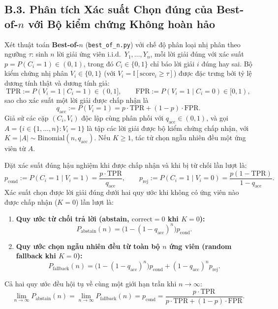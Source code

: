 \subsection{B.3. Phân tích Xác suất Chọn đúng của Best-of-$n$ với Bộ kiểm chứng Không hoàn hảo}
\label{subsec:b3-best-of-n}

Xét thuật toán \textbf{Best-of-$n$} (\texttt{best\_of\_n.py}) với chế độ phân loại nhị phân theo ngưỡng $\tau$: sinh $n$ lời giải ứng viên i.i.d.\ $Y_1, \dots, Y_n$, mỗi lời giải đúng với xác suất $p = P(C_i = 1) \in (0, 1)$, trong đó $C_i \in \{0, 1\}$ chỉ báo lời giải $i$ đúng hay sai. Bộ kiểm chứng nhị phân $V_i \in \{0, 1\}$ (với $V_i = \mathbb{I}[\text{score}_i \ge \tau]$) được đặc trưng bởi tỷ lệ dương tính thật và dương tính giả:
\[
  \text{TPR} := P(V_i = 1 \mid C_i = 1) \in (0, 1], \qquad
  \text{FPR} := P(V_i = 1 \mid C_i = 0) \in [0, 1),
\]
sao cho xác suất một lời giải được chấp nhận là
\[
  q_{\text{acc}} := P(V_i = 1) = p \cdot \text{TPR} + (1 - p) \cdot \text{FPR}.
\]
Giả sử các cặp $(C_i, V_i)$ độc lập cùng phân phối với $q_{\text{acc}} \in (0, 1)$, và gọi $A = \{i \in \{1,\dots,n\} : V_i = 1\}$ là tập các lời giải được bộ kiểm chứng chấp nhận, với $K = |A| \sim \text{Binomial}(n, q_{\text{acc}})$. Nếu $K \ge 1$, tác tử chọn ngẫu nhiên đều một ứng viên từ $A$.

\begin{theorem}
\label{thm:b3-best-of-n}
Đặt xác suất đúng hậu nghiệm khi được chấp nhận và khi bị từ chối lần lượt là:
\[
  p_{\text{cond}} := P(C_i = 1 \mid V_i = 1) = \frac{p \cdot \text{TPR}}{q_{\text{acc}}}, \qquad
  p_{\text{rej}} := P(C_i = 1 \mid V_i = 0) = \frac{p(1 - \text{TPR})}{1 - q_{\text{acc}}}.
\]
Xác suất chọn được lời giải đúng dưới hai quy ước khi không có ứng viên nào được chấp nhận ($K = 0$) lần lượt là:
\begin{enumerate}
  \item \textbf{Quy ước từ chối trả lời (abstain, $\text{correct}=0$ khi $K=0$):}
  \begin{equation}
    P_{\text{abstain}}(n) = \bigl(1 - (1 - q_{\text{acc}})^n\bigr) p_{\text{cond}}.
    \label{eq:b3-abstain}
  \end{equation}
  \item \textbf{Quy ước chọn ngẫu nhiên đều từ toàn bộ $n$ ứng viên (random fallback khi $K=0$):}
  \begin{equation}
    P_{\text{fallback}}(n) = \bigl(1 - (1 - q_{\text{acc}})^n\bigr) p_{\text{cond}} + (1 - q_{\text{acc}})^n p_{\text{rej}}.
    \label{eq:b3-fallback}
  \end{equation}
\end{enumerate}
Cả hai quy ước đều hội tụ về cùng một giới hạn trần khi $n \to \infty$:
\begin{equation}
  \lim_{n \to \infty} P_{\text{abstain}}(n) = \lim_{n \to \infty} P_{\text{fallback}}(n) = p_{\text{cond}} = \frac{p \cdot \text{TPR}}{p \cdot \text{TPR} + (1 - p) \cdot \text{FPR}}.
  \label{eq:b3-limit}
\end{equation}
\end{theorem}

